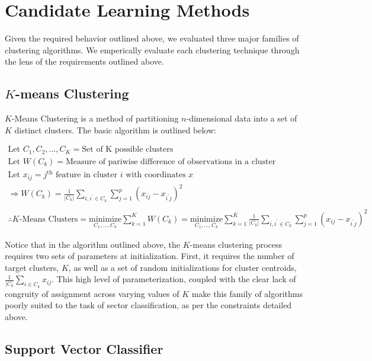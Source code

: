 \documentclass[../main.tex]{subfiles}
\begin{document}
\section{Candidate Learning Methods}

Given the required behavior outlined above, we evaluated three major families of clustering algorithms. We emperically evaluate each clustering technique through the lens of the requirements outlined above.

\subsection{$K$-means Clustering}

$K$-Means Clustering is a method of partitioning $n$-dimensional data into a set of $K$ distinct clusters. The basic algorithm is outlined below:

\begin{gather*}
    \text{Let $C_1, C_2, \ldots, C_K$} = \text{Set of K possible clusters} \\
    \text{Let $W(C_k)$} = \text{Measure of pariwise difference of observations in a cluster} \\
    \text{Let $x_{ij}$} = \text{$j^\text{th}$ feature in cluster $i$ with coordinates $x$} \\
    \Rightarrow W(C_k) = \frac{1}{|C_k|} \sum_{i, i^\prime \in C_k} \sum_{j = 1}^p (x_{ij} - x_{i^\prime j})^2 \\
    \\
    \therefore \text{$K$-Means Clusters}
    = \underset{C_1, \ldots, C_k}{\text{minimize}} \sum_{k=1}^K W(C_k)
    = \underset{C_1, \ldots, C_k}{\text{minimize}} \sum_{k=1}^K \frac{1}{|C_k|} \sum_{i, i^\prime \in C_k} \sum_{j = 1}^p (x_{ij} - x_{i^\prime j})^2
\end{gather*}

Notice that in the algorithm outlined above, the $K$-means clustering process requires two sets of parameters at initialization. First, it requires the number of target clusters, $K$, as well as a set of random initializations for cluster centroids, $\frac{1}{|C_k} \sum_{i \in C_k} x_{ij}$. This high level of parameterization, coupled with the clear lack of congruity of assignment across varying values of $K$ make this family of algorithms poorly suited to the task of sector classification, as per the constraints detailed above.

\subsection{Support Vector Classifier}
\end{document}
